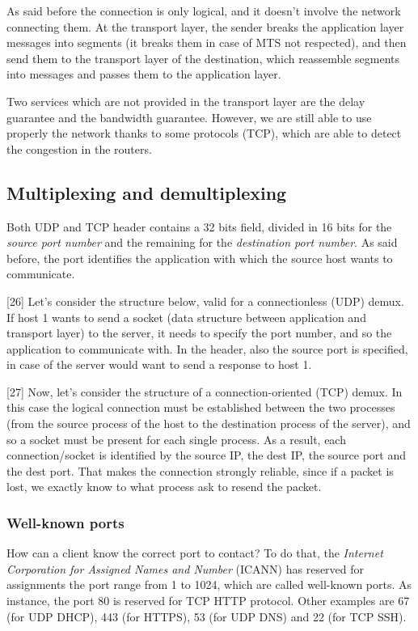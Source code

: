 \noindent As said before the connection is only logical, and it doesn't involve the network connecting them. At the transport layer, the sender breaks the application layer messages into segments (it breaks them in case of MTS not respected), and then send them to the transport layer of the destination, which reassemble segments into messages and passes them to the application layer.

Two services which are not provided in the transport layer are the delay guarantee and the bandwidth guarantee. However, we are still able to use properly the network thanks to some protocols (TCP), which are able to detect the congestion in the routers.

\subsection{Multiplexing and demultiplexing}

Both UDP and TCP header contains a 32 bits field, divided in 16 bits for the \textit{source port number} and the remaining for the \textit{destination port number}. As said before, the port identifies the application with which the source host wants to communicate.

[26]
Let's consider the structure below, valid for a connectionless (UDP) demux. If host 1 wants to send a socket (data structure between application and transport layer) to the server, it needs to specify the port number, and so the application to communicate with. In the header, also the source port is specified, in case of the server would want to send a response to host 1.

[27]
Now, let's consider the structure of a connection-oriented (TCP) demux. In this case the logical connection must be established between the two processes (from the source process of the host to the destination process of the server), and so a socket must be present for each single process. As a result, each connection/socket is identified by the source IP, the dest IP, the source port and the dest port. That makes the connection strongly reliable, since if a packet is lost, we exactly know to what process ask to resend the packet.

\subsubsection{Well-known ports}
How can a client know the correct port to contact? To do that, the \textit{Internet Corporation for Assigned Names and Number} (ICANN) has reserved for assignments the port range from 1 to 1024, which are called well-known ports. As instance, the port 80 is reserved for TCP HTTP protocol. Other examples are 67 (for UDP DHCP), 443 (for HTTPS), 53 (for UDP DNS) and 22 (for TCP SSH).

